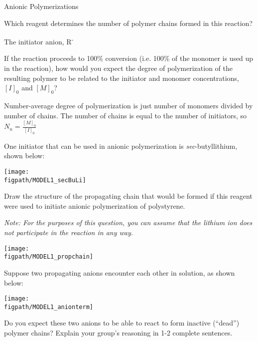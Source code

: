 \begin{activity}{Anionic Polymerizations}
\begin{ctqs}

	
	\question Which reagent determines the number of polymer chains formed in this reaction?
	
		\begin{solution}[0.25in]{}
			The initiator anion, R\textsuperscript{-}
		\end{solution}
	
	\question If the reaction proceeds to 100\% conversion (i.e. 100\% of the monomer is used up in the reaction), how would you expect the degree of polymerization of the resulting polymer to be related to the initiator and monomer concentrations, $[I]_0$ and $[M]_0$?
	
		\begin{solution}[0.5in]{}
			Number-average degree of polymerization is just number of monomers divided by number of chains.  The number of chains is equal to the number of initiators, so $N_n = \frac{[M]_0}{[I]_0}$
		\end{solution}
	
	\question One initiator that can be used in anionic polymerization is \emph{sec}-butyllithium, shown below:
	 \label{\labelbase:ctq:ps-anionic-prop}
	
	\centerline{\texttt{[image: \\figpath/MODEL1\_secBuLi]}}
	 	
	 	Draw the structure of the propagating chain that would be formed if this reagent were used to initiate anionic polymerization of polystyrene.
	 	
	 	\emph{Note: For the purposes of this question, you can assume that the lithium ion does not participate in the reaction in any way.}
	
		\begin{solution}[1in]{}
		\centerline{\texttt{[image: \\figpath/MODEL1\_propchain]}}
		\end{solution}
	
	\question Suppose two propagating anions encounter each other in solution, as shown below:
	
	\centerline{\texttt{[image: \\figpath/MODEL1\_anionterm]}}
	
		Do you expect these two anions to be able to react to form inactive (``dead'') polymer chains?  Explain your group's reasoning in 1-2 complete sentences.
	

\end{ctqs}
\end{activity}
